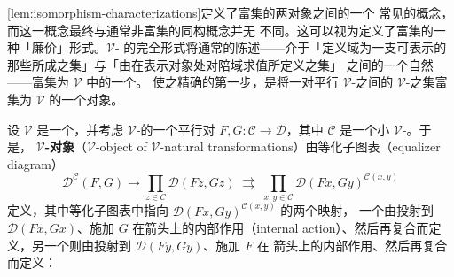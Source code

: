 \cref{lem:isomorphism-characterizations}定义了富集\trCategory{}的两对象之间的一个
常见的\textbf{\trIsomorphism}概念，而这一概念最终与通常非富集的同构概念并无
不同。这可以视为定义了富集\trYonedaLemma{}的一种「廉价」形式。$\mathcal{V}$-%
\trYonedaLemma{}的完全形式将通常的陈述——介于「定义域为一支可表示\trFunctor{}的
那些\trNaturalTransformation{}所成之集」与「由在表示对象处对陪域求值所定义之集」
之间的一个自然\trIsomorphism——富集为 $\mathcal{V}$ 中的一个\trIsomorphism。
使之精确的第一步，是将一对平行 $\mathcal{V}$-\trFunctor{}之间的
$\mathcal{V}$-\trNaturalTransformation{}之集富集为 $\mathcal{V}$ 的一个对象。

\begin{definition}\label{def:vobject-natural-transformations}
设 $\mathcal{V}$ 是一个\trComplete{}\trCartesianClosed{}\trCategory，并考虑
$\mathcal{V}$-\trFunctor{}的一个平行对 $F,G\colon\mathcal{C}\to\mathcal{D}$，其中
$\mathcal{C}$ 是一个小 $\mathcal{V}$-\trCategory。于是，
$\mathcal{V}$\textbf{-\trNaturalTransformation{}对象}（$\mathcal{V}$-object of
$\mathcal{V}$-natural transformations）由等化子图表（equalizer diagram）
\[ \mathcal{D}^{\mathcal{C}}(F,G)\longrightarrow
   \prod_{z\in\mathcal{C}}\mathcal{D}(Fz,Gz)
   \;\rightrightarrows\;
   \prod_{x,y\in\mathcal{C}}\mathcal{D}(Fx,Gy)^{\mathcal{C}(x,y)} \]
定义，其中等化子图表中指向 $\mathcal{D}(Fx,Gy)^{\mathcal{C}(x,y)}$ 的两个映射，
一个由投射到 $\mathcal{D}(Fx,Gx)$、施加 $G$ 在箭头上的内部作用（internal
action）、然后再复合而定义，另一个则由投射到 $\mathcal{D}(Fy,Gy)$、施加 $F$ 在
箭头上的内部作用、然后再复合而定义：
\begin{center}
\end{center}
\end{definition}

